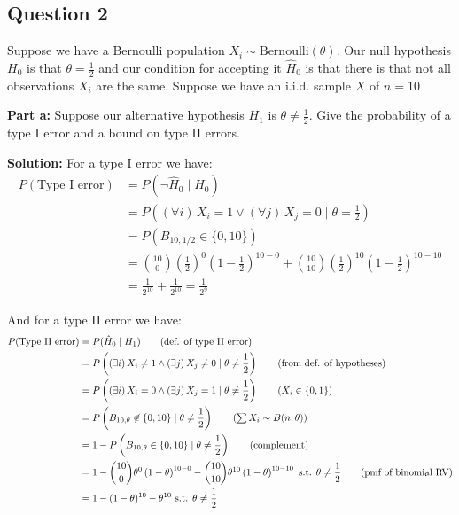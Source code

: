 \documentclass{article}
\begin{document}
\subsection*{Question 2}
Suppose we have a Bernoulli population $X_i\sim\text{Bernoulli}(\theta)$. Our null hypothesis $H_0$ is that $\theta=\frac{1}{2}$ and our condition for accepting it $\hat H_0$ is that there is that not all observations $X_i$ are the same. Suppose we have an i.i.d. sample $X$ of $n=10$
\bigskip

\noindent\textbf{Part a:} Suppose our alternative hypothesis $H_1$ is $\theta\not=\frac{1}{2}$. Give the probability of a type I error and a bound on type II errors.
\bigskip

\noindent\textbf{Solution:} For a type I error we have:
\begin{align*}
    P(\text{Type I error})&=P(\neg\hat H_0\mid H_0)\tag{def. of type I error}\\
    &=P\left((\forall i)\,X_i=1\vee(\forall j)\,X_j=0\mid\theta=\frac{1}{2}\right)\tag{from def. of hypotheses}\\
    &=P\left(B_{10,1/2}\in\{0,10\}\right)\tag{$\sum X_i\sim B(n,\theta)$}\\
    &=\binom{10}{0}\left(\frac{1}{2}\right)^0\left(1-\frac{1}{2}\right)^{10-0}+\binom{10}{10}\left(\frac{1}{2}\right)^{10}\left(1-\frac{1}{2}\right)^{10-10}\tag{pmf of binomial RV}\\
    &=\frac{1}{2^{10}}+\frac{1}{2^{10}}=\frac{1}{2^9}
\end{align*}

And for a type II error we have:
\begin{align*}
    P(\text{Type II error})&=P(\hat H_0\mid H_1)\tag{def. of type II error}\\
    &=P\left((\exists i)\,X_i\not=1\wedge(\exists j)\,X_j\not=0\mid\theta\not=\frac{1}{2}\right)\tag{from def. of hypotheses}\\
    &=P\left((\exists i)\,X_i=0\wedge(\exists j)\,X_j=1\mid\theta\not=\frac{1}{2}\right)\tag{$X_i\in\{0,1\}$}\\
    &=P\left(B_{10,\theta}\not\in\{0,10\}\mid\theta\not=\frac{1}{2}\right)\tag{$\sum X_i\sim B(n,\theta)$}\\
    &=1-P\left(B_{10,\theta}\in\{0,10\}\mid\theta\not=\frac{1}{2}\right)\tag{complement}\\
    &=1-\binom{10}{0}\theta^0\left(1-\theta\right)^{10-0}-\binom{10}{10}\theta^{10}\left(1-\theta\right)^{10-10}\text{ s.t. }\theta\not=\frac{1}{2}\tag{pmf of binomial RV}\\
    &=1-(1-\theta)^{10}-\theta^{10}\text{ s.t. }\theta\not=\frac{1}{2}
\end{align*}
\end{document}
